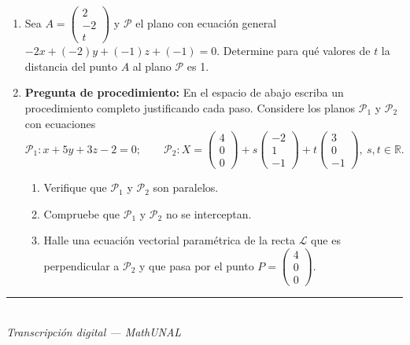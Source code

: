 \documentclass[11pt]{article}
\newcommand{\vectiii}[3]{\begin{pmatrix}#1\\#2\\#3\end{pmatrix}}
\newcommand{\examfooter}{\vfill\rule{\linewidth}{0.4pt}\\[1pt]{\scriptsize\textit{Transcripción digital --- MathUNAL}\hfill\textcolor{unalblue}{\textbf{\thepage}}}}
\begin{document}
\begin{enumerate}
\item Sea $A=\vectiii{2}{-2}{t}$ y $\mathcal{P}$ el plano con ecuación general $-2x+(-2)y+(-1)z+(-1)=0$. Determine para qué valores de $t$ la distancia del punto $A$ al plano $\mathcal{P}$ es 1.

\item \textbf{Pregunta de procedimiento:} En el espacio de abajo escriba un procedimiento completo justificando cada paso. Considere los planos $\mathcal{P}_1$ y $\mathcal{P}_2$ con ecuaciones
$$\mathcal{P}_1: x+5y+3z-2=0;\qquad \mathcal{P}_2: X=\vectiii{4}{0}{0}+s\vectiii{-2}{1}{-1}+t\vectiii{3}{0}{-1},\ s,t\in\mathbb{R}.$$
\begin{enumerate}[label=\alph*)]
\item Verifique que $\mathcal{P}_1$ y $\mathcal{P}_2$ son paralelos.
\item Compruebe que $\mathcal{P}_1$ y $\mathcal{P}_2$ no se interceptan.
\item Halle una ecuación vectorial paramétrica de la recta $\mathcal{L}$ que es perpendicular a $\mathcal{P}_2$ y que pasa por el punto $P=\vectiii{4}{0}{0}$.
\end{enumerate}
\end{enumerate}

\examfooter
\end{document}
